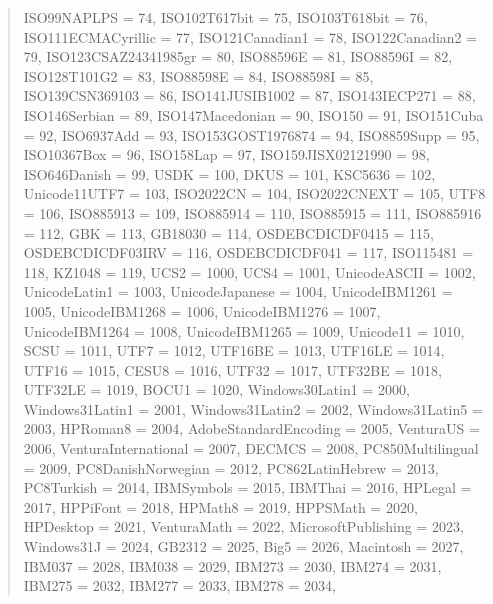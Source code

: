 \documentclass{wg21}
\begin{document}
\begin{quote}
\begin{addedblock}
\begin{codeblock}
{{{        ISO99NAPLPS = 74,
        ISO102T617bit = 75,
        ISO103T618bit = 76,
        ISO111ECMACyrillic = 77,
        ISO121Canadian1 = 78,
        ISO122Canadian2 = 79,
        ISO123CSAZ24341985gr = 80,
        ISO88596E = 81,
        ISO88596I = 82,
        ISO128T101G2 = 83,
        ISO88598E = 84,
        ISO88598I = 85,
        ISO139CSN369103 = 86,
        ISO141JUSIB1002 = 87,
        ISO143IECP271 = 88,
        ISO146Serbian = 89,
        ISO147Macedonian = 90,
        ISO150 = 91,
        ISO151Cuba = 92,
        ISO6937Add = 93,
        ISO153GOST1976874 = 94,
        ISO8859Supp = 95,
        ISO10367Box = 96,
        ISO158Lap = 97,
        ISO159JISX02121990 = 98,
        ISO646Danish = 99,
        USDK = 100,
        DKUS = 101,
        KSC5636 = 102,
        Unicode11UTF7 = 103,
        ISO2022CN = 104,
        ISO2022CNEXT = 105,
        UTF8 = 106,
        ISO885913 = 109,
        ISO885914 = 110,
        ISO885915 = 111,
        ISO885916 = 112,
        GBK = 113,
        GB18030 = 114,
        OSDEBCDICDF0415 = 115,
        OSDEBCDICDF03IRV = 116,
        OSDEBCDICDF041 = 117,
        ISO115481 = 118,
        KZ1048 = 119,
        UCS2 = 1000,
        UCS4 = 1001,
        UnicodeASCII = 1002,
        UnicodeLatin1 = 1003,
        UnicodeJapanese = 1004,
        UnicodeIBM1261 = 1005,
        UnicodeIBM1268 = 1006,
        UnicodeIBM1276 = 1007,
        UnicodeIBM1264 = 1008,
        UnicodeIBM1265 = 1009,
        Unicode11 = 1010,
        SCSU = 1011,
        UTF7 = 1012,
        UTF16BE = 1013,
        UTF16LE = 1014,
        UTF16 = 1015,
        CESU8 = 1016,
        UTF32 = 1017,
        UTF32BE = 1018,
        UTF32LE = 1019,
        BOCU1 = 1020,
        Windows30Latin1 = 2000,
        Windows31Latin1 = 2001,
        Windows31Latin2 = 2002,
        Windows31Latin5 = 2003,
        HPRoman8 = 2004,
        AdobeStandardEncoding = 2005,
        VenturaUS = 2006,
        VenturaInternational = 2007,
        DECMCS = 2008,
        PC850Multilingual = 2009,
        PC8DanishNorwegian = 2012,
        PC862LatinHebrew = 2013,
        PC8Turkish = 2014,
        IBMSymbols = 2015,
        IBMThai = 2016,
        HPLegal = 2017,
        HPPiFont = 2018,
        HPMath8 = 2019,
        HPPSMath = 2020,
        HPDesktop = 2021,
        VenturaMath = 2022,
        MicrosoftPublishing = 2023,
        Windows31J = 2024,
        GB2312 = 2025,
        Big5 = 2026,
        Macintosh = 2027,
        IBM037 = 2028,
        IBM038 = 2029,
        IBM273 = 2030,
        IBM274 = 2031,
        IBM275 = 2032,
        IBM277 = 2033,
        IBM278 = 2034,
}}}
\end{codeblock}
\end{addedblock}
\end{quote}
\end{document}
